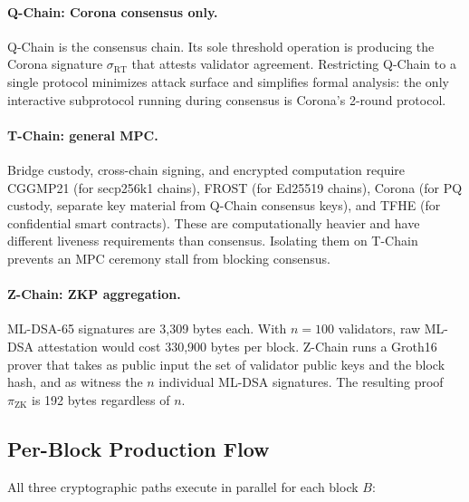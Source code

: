 \paragraph{Q-Chain: Corona consensus only.}
Q-Chain is the consensus chain.  Its sole threshold operation is
producing the Corona signature $\sigma_{\mathrm{RT}}$ that attests
validator agreement.  Restricting Q-Chain to a single protocol
minimizes attack surface and simplifies formal analysis: the only
interactive subprotocol running during consensus is Corona's 2-round
protocol.

\paragraph{T-Chain: general MPC.}
Bridge custody, cross-chain signing, and encrypted computation require
CGGMP21 (for secp256k1 chains), FROST (for Ed25519 chains), Corona
(for PQ custody, separate key material from Q-Chain consensus keys),
and TFHE (for confidential smart contracts).  These are computationally
heavier and have different liveness requirements than consensus.
Isolating them on T-Chain prevents an MPC ceremony stall from blocking
consensus.

\paragraph{Z-Chain: ZKP aggregation.}
ML-DSA-65 signatures are 3{,}309 bytes each.  With $n = 100$
validators, raw ML-DSA attestation would cost 330{,}900 bytes per
block.  Z-Chain runs a Groth16 prover that takes as public input the
set of validator public keys and the block hash, and as witness the $n$
individual ML-DSA signatures.  The resulting proof $\pi_{\mathrm{ZK}}$
is 192 bytes regardless of $n$.

\subsection{Per-Block Production Flow}
\label{sec:per-block}

All three cryptographic paths execute in parallel for each block $B$:

